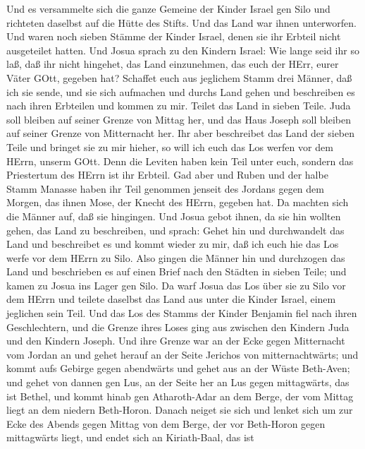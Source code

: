  Und es versammelte sich die ganze Gemeine der Kinder Israel
gen Silo und richteten daselbst auf die Hütte des Stifts. Und das Land
war ihnen unterworfen.  Und waren noch sieben Stämme der
Kinder Israel, denen sie ihr Erbteil nicht ausgeteilet hatten.
 Und Josua sprach zu den Kindern Israel: Wie lange seid ihr
so laß, daß ihr nicht hingehet, das Land einzunehmen, das euch der HErr,
eurer Väter GOtt, gegeben hat?  Schaffet euch aus jeglichem
Stamm drei Männer, daß ich sie sende, und sie sich aufmachen und durchs
Land gehen und beschreiben es nach ihren Erbteilen und kommen zu mir.
 Teilet das Land in sieben Teile. Juda soll bleiben auf
seiner Grenze von Mittag her, und das Haus Joseph soll bleiben auf
seiner Grenze von Mitternacht her.  Ihr aber beschreibet das
Land der sieben Teile und bringet sie zu mir hieher, so will ich euch
das Los werfen vor dem HErrn, unserm GOtt.  Denn die Leviten
haben kein Teil unter euch, sondern das Priestertum des HErrn ist ihr
Erbteil. Gad aber und Ruben und der halbe Stamm Manasse haben ihr Teil
genommen jenseit des Jordans gegen dem Morgen, das ihnen Mose, der
Knecht des HErrn, gegeben hat.  Da machten sich die Männer
auf, daß sie hingingen. Und Josua gebot ihnen, da sie hin wollten gehen,
das Land zu beschreiben, und sprach: Gehet hin und durchwandelt das Land
und beschreibet es und kommt wieder zu mir, daß ich euch hie das Los
werfe vor dem HErrn zu Silo.  Also gingen die Männer hin und
durchzogen das Land und beschrieben es auf einen Brief nach den Städten
in sieben Teile; und kamen zu Josua ins Lager gen Silo.  Da
warf Josua das Los über sie zu Silo vor dem HErrn und teilete daselbst
das Land aus unter die Kinder Israel, einem jeglichen sein Teil.
 Und das Los des Stamms der Kinder Benjamin fiel nach ihren
Geschlechtern, und die Grenze ihres Loses ging aus zwischen den Kindern
Juda und den Kindern Joseph.  Und ihre Grenze war an der
Ecke gegen Mitternacht vom Jordan an und gehet herauf an der Seite
Jerichos von mitternachtwärts; und kommt aufs Gebirge gegen abendwärts
und gehet aus an der Wüste Beth-Aven;  und gehet von dannen
gen Lus, an der Seite her an Lus gegen mittagwärts, das ist Bethel, und
kommt hinab gen Atharoth-Adar an dem Berge, der vom Mittag liegt an dem
niedern Beth-Horon.  Danach neiget sie sich und lenket sich
um zur Ecke des Abends gegen Mittag von dem Berge, der vor Beth-Horon
gegen mittagwärts liegt, und endet sich an Kiriath-Baal, das ist
